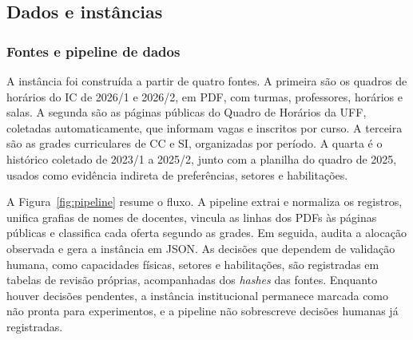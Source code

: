 \subsection{Dados e instâncias}
\label{subsec:dados}

\subsubsection{Fontes e pipeline de dados}

A instância foi construída a partir de quatro fontes. A primeira são os quadros de horários do IC de 2026/1 e 2026/2, em PDF, com turmas, professores, horários e salas. A segunda são as páginas públicas do Quadro de Horários da UFF, coletadas automaticamente, que informam vagas e inscritos por curso. A terceira são as grades curriculares de CC e SI, organizadas por período. A quarta é o histórico coletado de 2023/1 a 2025/2, junto com a planilha do quadro de 2025, usados como evidência indireta de preferências, setores e habilitações.

A Figura~\ref{fig:pipeline} resume o fluxo. A pipeline extrai e normaliza os registros, unifica grafias de nomes de docentes, vincula as linhas dos PDFs às páginas públicas e classifica cada oferta segundo as grades. Em seguida, audita a alocação observada e gera a instância em JSON. As decisões que dependem de validação humana, como capacidades físicas, setores e habilitações, são registradas em tabelas de revisão próprias, acompanhadas dos \textit{hashes} das fontes. Enquanto houver decisões pendentes, a instância institucional permanece marcada como não pronta para experimentos, e a pipeline não sobrescreve decisões humanas já registradas.

